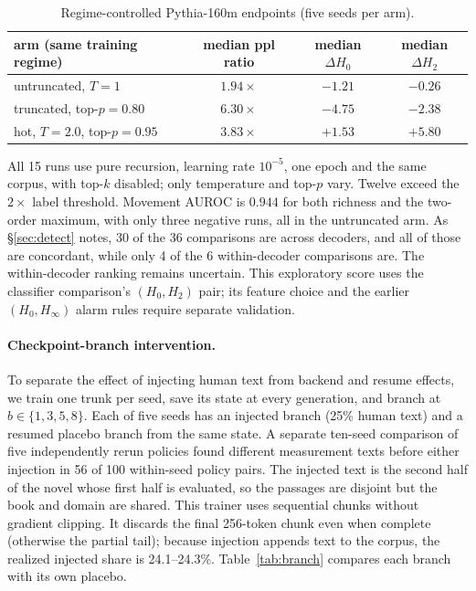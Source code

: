 \documentclass[10pt]{article}
\theoremstyle{plain}
\theoremstyle{definition}
\newcommand{\Htwo}{H_2}
\newcommand{\Hz}{H_0}
\begin{document}
\begin{table}[ht]
\centering\small
\caption{Regime-controlled Pythia-160m endpoints (five seeds per arm).}
\label{tab:pythia}
\begin{tabular}{lccc}
\toprule
arm (same training regime) & median ppl ratio & median $\Delta\Hz$ & median $\Delta\Htwo$ \\
\midrule
untruncated, $T=1$ & $1.94\times$ & $-1.21$ & $-0.26$ \\
truncated, top-$p{=}0.80$ & $6.30\times$ & $-4.75$ & $-2.38$ \\
hot, $T{=}2.0$, top-$p{=}0.95$ & $3.83\times$ & $\mathbf{+1.53}$ & $\mathbf{+5.80}$ \\
\bottomrule
\end{tabular}
\end{table}

All 15 runs use pure recursion, learning rate $10^{-5}$, one epoch and the same corpus, with
top-$k$ disabled; only temperature and top-$p$ vary. Twelve exceed the $2\times$ label threshold.
Movement AUROC is $0.944$ for both richness and the two-order maximum, with only three negative
runs, all in the untruncated arm. As \S\ref{sec:detect} notes, 30 of the 36 comparisons are across
decoders, and all of those are concordant, while only 4 of the 6 within-decoder comparisons are.
The within-decoder ranking remains uncertain. This exploratory score uses the classifier
comparison's $(H_0,H_2)$ pair; its feature choice and the earlier $(H_0,H_\infty)$ alarm rules
require separate validation.

\paragraph{Checkpoint-branch intervention.} To separate the effect of injecting human text from
backend and resume effects, we train one trunk per seed, save its state at every generation, and
branch at $b\in\{1,3,5,8\}$. Each of five seeds has an injected branch (25\% human text) and a
resumed placebo branch from the same state. A separate ten-seed comparison of five independently rerun policies found different
measurement texts before either injection in 56 of 100 within-seed policy pairs. The injected text is the second
half of the novel whose first half is evaluated, so the passages are disjoint but the book and
domain are shared. This trainer uses sequential chunks without gradient clipping. It discards
the final 256-token chunk even when complete (otherwise the partial tail); because injection
appends text to the corpus, the realized injected share is 24.1--24.3\%. Table~\ref{tab:branch} compares each branch with its
own placebo.
\end{document}
